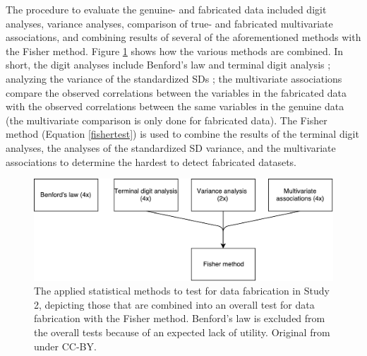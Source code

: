 \documentclass{article}
\begin{document}
The procedure to evaluate the genuine- and fabricated data included digit analyses, variance analyses, comparison of true- and fabricated multivariate associations, and combining results of several of the aforementioned methods with the Fisher method. Figure \ref{study2proc} shows how the various methods are combined. In short, the digit analyses include Benford's law \citep{Benford1938-fl} and terminal digit analysis \citep{Mosimann1995-av,Mosimann2002-oj}; analyzing the variance of the standardized SDs \citep[similar to Study 1;][]{simonsohn2013}; the multivariate associations compare the observed correlations between the variables in the fabricated data with the observed correlations between the same variables in the genuine data (the multivariate comparison is only done for fabricated data). The Fisher method (Equation \ref{fishertest}) is used to combine the results of the terminal digit analyses, the analyses of the standardized SD variance, and the multivariate associations to determine the hardest to detect fabricated datasets. 

\begin{figure}
\begin{center}
\includegraphics[width=\textwidth,height=\textheight,keepaspectratio]{../figures/study2proc.pdf}
\caption{The applied statistical methods to test for data fabrication in Study 2, depicting those that are combined into an overall test for data fabrication with the Fisher method. Benford’s law is excluded from the overall tests because of an expected lack of utility. Original from \citet{10.3897/rio.2.e8860} under CC-BY.}
\label{study2proc}
\end{center}
\end{figure}
\end{document}
